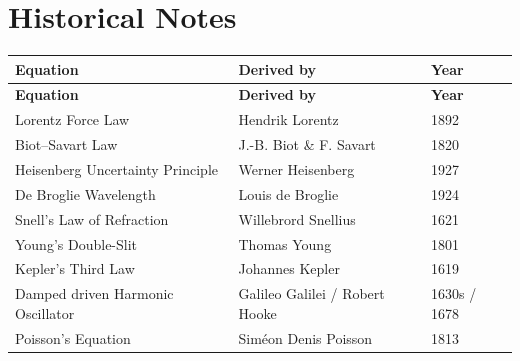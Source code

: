 \chapter{Historical Notes}
\begin{longtable}{p{6cm}p{6cm}p{2.5cm}}
\textbf{Equation} & \textbf{Derived by} & \textbf{Year} \\
\hline
\endfirsthead
\textbf{Equation} & \textbf{Derived by} & \textbf{Year} \\
\hline
\endhead
Lorentz Force Law & Hendrik Lorentz & 1892 \\
Biot--Savart Law & J.-B. Biot \& F. Savart & 1820 \\
Heisenberg Uncertainty Principle & Werner Heisenberg & 1927 \\
De Broglie Wavelength & Louis de Broglie & 1924 \\
Snell's Law of Refraction & Willebrord Snellius & 1621 \\
Young's Double-Slit & Thomas Young & 1801 \\
Kepler's Third Law & Johannes Kepler & 1619 \\
Damped driven Harmonic Oscillator & Galileo Galilei / Robert Hooke & 1630s / 1678 \\
Poisson's Equation & Sim\'{e}on Denis Poisson & 1813 \\


\end{longtable}
